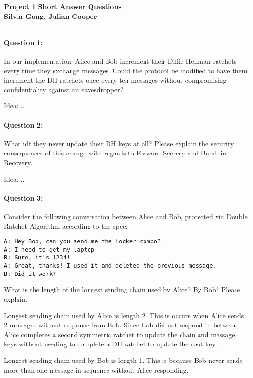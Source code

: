 \documentclass[12pt,letterpaper,twoside]{article}
\begin{document}
{\centering \textbf{Project 1 Short Answer Questions\\ Silvia Gong, Julian Cooper\\}}
\vspace*{-8pt}\noindent\rule{\linewidth}{1pt}

\paragraph{Question 1: } In our implementation, Alice and Bob increment their
Diffie-Hellman ratchets every time they exchange messages. Could the protocol
be modified to have them increment the DH ratchets once every ten messages 
without compromising confidentiality against an eavesdropper?

{\color{purple}Idea: .. }


\paragraph{Question 2: } What idf they never update their DH keys at all?
Please explain the security consequences of this change with regards to
Forward Secrecy and Break-in Recovery.

{\color{purple}Idea: .. }


\paragraph{Question 3: } Consider the following conversation between Alice 
and Bob, protected via Double Ratchet Algorithm according to the spec:

\begin{verbatim}
A: Hey Bob, can you send me the locker combo?
A: I need to get my laptop
B: Sure, it's 1234!
A: Great, thanks! I used it and deleted the previous message.
B: Did it work?
\end{verbatim}

What is the length of the longest sending chain used by Alice? By Bob? 
Please explain.

{\color{purple} Longest sending chain used by Alice is length 2. This is 
occurs when Alice sends 2 messages without response from Bob. Since Bob 
did not respond in between, Alice completes a second symmetric ratchet 
to update the chain and message keys without needing to complete a DH 
ratchet to update the root key. }

{\color{purple} Longest sending chain used by Bob is length 1. This is 
because Bob never sends more than one message in sequence without Alice
responding. }
\end{document}
